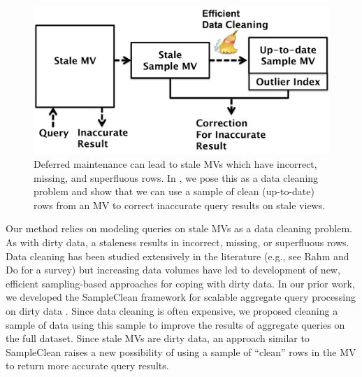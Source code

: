 
\begin{figure}[t] \vspace{-2em}
\centering
 \includegraphics[scale=0.25]{figs/sys-arch.pdf} \vspace{-.25em}
 \caption{Deferred maintenance can lead to stale MVs which have incorrect, missing, and superfluous rows. In \svc, we pose this as a data cleaning problem and show that we can use a sample of clean (up-to-date) rows from an MV to correct inaccurate query results on stale views. \label{sys-arch}}\vspace{-1.75em}
\end{figure}

Our method relies on modeling queries on stale MVs as a data cleaning problem.
As with dirty data, a staleness results in incorrect, missing, or superfluous rows.
Data cleaning has been studied extensively in the literature (e.g., see Rahm and Do for a survey\cite{rahm2000data}) but increasing data volumes have led to development of new, efficient sampling-based approaches for coping with dirty data.   
In our prior work, we developed the SampleClean framework for scalable aggregate query processing on dirty data \cite{wang1999sample}.
Since data cleaning is often expensive, we proposed cleaning a sample of data using this sample to improve the results of aggregate queries on the full dataset.
Since stale MVs are dirty data, an approach similar to SampleClean raises a new possibility of using a sample of ``clean'' rows in the MV to return more accurate query results.

